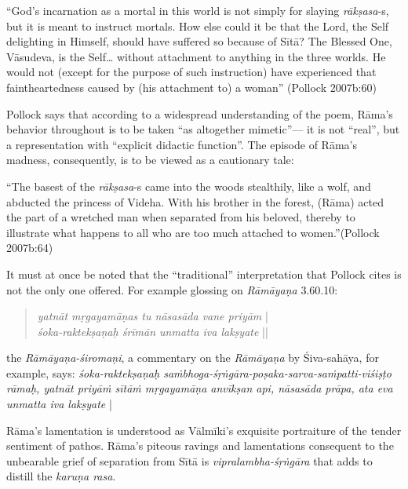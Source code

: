 \begin{myquote}
“God's incarnation as a mortal in this world is not simply for slaying {\sl rākṣasa}-s, but it is meant to instruct mortals. How else could it be that the Lord, the Self delighting in Himself, should have suffered so because of Sītā? The Blessed One, Vāsudeva, is the Self… without attachment to anything in the three worlds. He would not (except for the purpose of such instruction) have experienced that faintheartedness caused by (his attachment to) a woman” (Pollock 2007b:60)
\end{myquote}

Pollock says that according to a widespread understanding of the poem, Rāma’s behavior throughout is to be taken “as altogether mimetic”--- it is not “real”, but a representation with “explicit didactic function”. The episode of Rāma’s madness, consequently, is to be viewed as a cautionary tale:

\begin{myquote}
“The basest of the {\sl rākṣasa}-s came into the woods stealthily, like a wolf, and abducted the princess of Videha. With his brother in the forest, (Rāma) acted the part of a wretched man when separated from his beloved, thereby to illustrate what happens to all who are too much attached to women.”\hfill (Pollock 2007b:64)
\end{myquote}

It must at once be noted that the “traditional” interpretation that Pollock cites is not the only one offered. For example glossing on {\sl Rāmāyaṇa} 3.60.10:\\[-20pt] 
\begin{quote}
{{\sl yatnāt mṛgayamāṇas tu nāsasāda vane priyām}}\label{verse42} |\\
{\sl śoka-raktekṣaṇaḥ śrīmān unmatta iva lakṣyate} ||\\[-20pt]  
\end{quote}
the {\sl Rāmāyaṇa-śiromaṇi}, a commentary on the {\sl Rāmāyaṇa} by Śiva-sahāya, for example, says: {\sl śoka-raktekṣaṇaḥ saṁbhoga-śṛṅgāra-poṣaka-sarva-saṁpatti-viśiṣṭo rāmaḥ, yatnāt priyāṁ sītāṁ mṛgaya\-māṇa anvīkṣan api, nāsasāda prāpa, ata eva unmatta iva lakṣyate} |  

Rāma’s lamentation is understood as Vālmīki’s exquisite portraiture of the tender sentiment of pathos. Rāma’s piteous ravings and lamentations consequent to the unbearable grief of separation from Sītā is {\sl vipralambha-śṛṅgāra} that adds to distill the {\sl karuṇa rasa}. 

